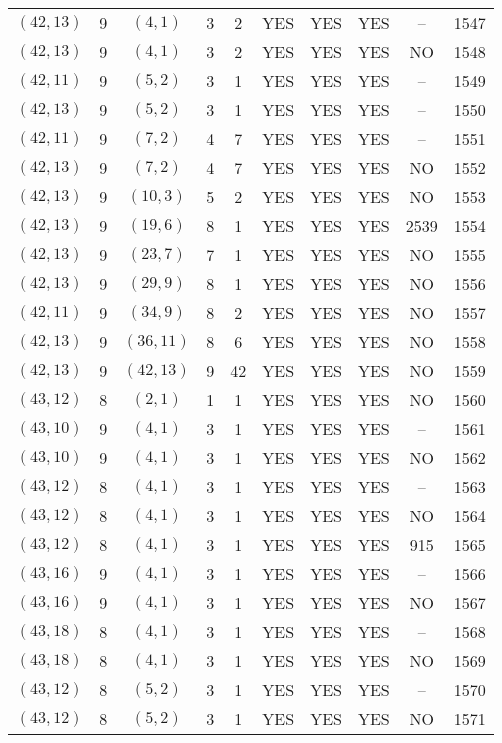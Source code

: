 \begin{longtable}{|c|c|c|c|c|c|c|c|c|c|}
$(42, 13)$ & 9 & $(4, 1)$ & 3 & 2 & YES & YES & YES & -- & 1547\\
$(42, 13)$ & 9 & $(4, 1)$ & 3 & 2 & YES & YES & YES & NO & 1548\\
$(42, 11)$ & 9 & $(5, 2)$ & 3 & 1 & YES & YES & YES & -- & 1549\\
$(42, 13)$ & 9 & $(5, 2)$ & 3 & 1 & YES & YES & YES & -- & 1550\\
$(42, 11)$ & 9 & $(7, 2)$ & 4 & 7 & YES & YES & YES & -- & 1551\\
$(42, 13)$ & 9 & $(7, 2)$ & 4 & 7 & YES & YES & YES & NO & 1552\\
$(42, 13)$ & 9 & $(10, 3)$ & 5 & 2 & YES & YES & YES & NO & 1553\\
$(42, 13)$ & 9 & $(19, 6)$ & 8 & 1 & YES & YES & YES & 2539 & 1554\\
$(42, 13)$ & 9 & $(23, 7)$ & 7 & 1 & YES & YES & YES & NO & 1555\\
$(42, 13)$ & 9 & $(29, 9)$ & 8 & 1 & YES & YES & YES & NO & 1556\\
$(42, 11)$ & 9 & $(34, 9)$ & 8 & 2 & YES & YES & YES & NO & 1557\\
$(42, 13)$ & 9 & $(36, 11)$ & 8 & 6 & YES & YES & YES & NO & 1558\\
$(42, 13)$ & 9 & $(42, 13)$ & 9 & 42 & YES & YES & YES & NO & 1559\\
$(43, 12)$ & 8 & $(2, 1)$ & 1 & 1 & YES & YES & YES & NO & 1560\\
$(43, 10)$ & 9 & $(4, 1)$ & 3 & 1 & YES & YES & YES & -- & 1561\\
$(43, 10)$ & 9 & $(4, 1)$ & 3 & 1 & YES & YES & YES & NO & 1562\\
$(43, 12)$ & 8 & $(4, 1)$ & 3 & 1 & YES & YES & YES & -- & 1563\\
$(43, 12)$ & 8 & $(4, 1)$ & 3 & 1 & YES & YES & YES & NO & 1564\\
$(43, 12)$ & 8 & $(4, 1)$ & 3 & 1 & YES & YES & YES & 915 & 1565\\
$(43, 16)$ & 9 & $(4, 1)$ & 3 & 1 & YES & YES & YES & -- & 1566\\
$(43, 16)$ & 9 & $(4, 1)$ & 3 & 1 & YES & YES & YES & NO & 1567\\
$(43, 18)$ & 8 & $(4, 1)$ & 3 & 1 & YES & YES & YES & -- & 1568\\
$(43, 18)$ & 8 & $(4, 1)$ & 3 & 1 & YES & YES & YES & NO & 1569\\
$(43, 12)$ & 8 & $(5, 2)$ & 3 & 1 & YES & YES & YES & -- & 1570\\
$(43, 12)$ & 8 & $(5, 2)$ & 3 & 1 & YES & YES & YES & NO & 1571\\

\end{longtable}
